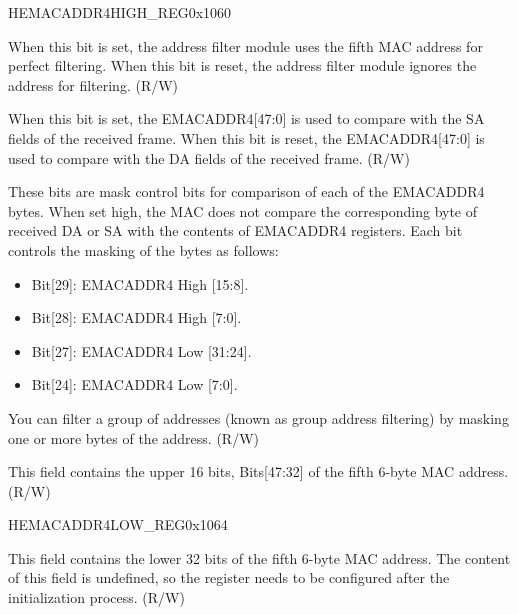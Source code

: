 \begin{register}{H}{EMACADDR4HIGH\_REG}{0x1060}\label{regdesc:EMACADDR4HIGHREG}
%
%
%
%
%
\regnewline%
\begin{regdesc}\begin{reglist}
\item [ADDRESS\_ENABLE4]When this bit is set, the address filter module uses the fifth MAC address  for perfect filtering. When this bit is reset, the address filter module ignores the address for filtering. (R/W)
\item [SOURCE\_ADDRESS4]When this bit is set, the EMACADDR4[47:0] is used to compare with the SA fields of the received frame. When this bit is reset, the EMACADDR4[47:0] is used to compare with the DA fields of the received frame. (R/W)
\item [MASK\_BYTE\_CONTROL4]These bits are mask control bits for comparison of each of the EMACADDR4 bytes. When set high, the MAC does not compare the corresponding byte of received DA or SA with the contents of EMACADDR4 registers. Each bit controls the masking of the bytes as follows: \begin{itemize}
\item Bit[29]: EMACADDR4 High [15:8]. \item Bit[28]: EMACADDR4 High [7:0]. \item Bit[27]: EMACADDR4 Low [31:24]. \item Bit[24]: EMACADDR4 Low [7:0].
\end{itemize} You can filter a group of addresses (known as group address filtering) by masking one or more bytes of the address. (R/W)
\item [MAC\_ADDRESS4\_HI]This field contains the upper 16 bits, Bits[47:32] of the fifth 6-byte MAC address. (R/W)
\end{reglist}\end{regdesc}
\end{register}


\begin{register}{H}{EMACADDR4LOW\_REG}{0x1064}\label{regdesc:EMACADDR4LOWREG}
%
\regnewline%
\begin{regdesc}\begin{reglist}
\item [EMACADDR4LOW\_REG]This field contains the lower 32 bits of the fifth 6-byte MAC address. The content of this field is undefined, so the register needs to be configured after the initialization process. (R/W)
\end{reglist}\end{regdesc}
\end{register}


